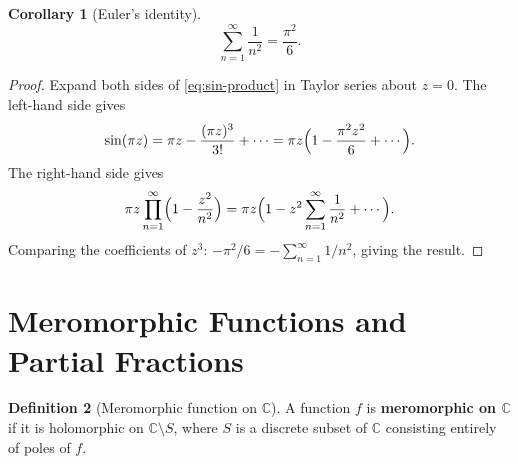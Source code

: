 \documentclass[12pt,a4paper,openany]{book}
\theoremstyle{definition}
\newtheorem{definition}{Definition}[chapter]
\theoremstyle{plain}
\newtheorem{corollary}[definition]{Corollary}
\theoremstyle{remark}
\newcommand{\C}{\mathbb{C}}
\newcommand{\Z}{\mathbb{Z}}
\DeclareMathOperator{\re}{Re}
\DeclareMathOperator{\im}{Im}
\begin{document}
\begin{center}
\label{fig:zeros-sin}
\end{center}

\begin{corollary}[Euler's identity]\label{cor:euler-identity}
\[
  \sum_{n=1}^{\infty} \frac{1}{n^2} = \frac{\pi^2}{6}.
\]
\end{corollary}

\begin{proof}
Expand both sides of \eqref{eq:sin-product} in Taylor series about $z=0$.
The left-hand side gives
\[
  \sin(\pi z) = \pi z - \frac{(\pi z)^3}{3!} + \cdots
  = \pi z\Bigl(1 - \frac{\pi^2 z^2}{6} + \cdots\Bigr).
\]
The right-hand side gives
\[
  \pi z \prod_{n=1}^{\infty}\Bigl(1 - \frac{z^2}{n^2}\Bigr)
  = \pi z \Bigl(1 - z^2\sum_{n=1}^{\infty}\frac{1}{n^2} + \cdots\Bigr).
\]
Comparing the coefficients of $z^3$:
$-\pi^2/6 = -\sum_{n=1}^{\infty}1/n^2$, giving the result.
\end{proof}


\section{Meromorphic Functions and Partial Fractions}\label{sec:meromorphic-partial}

\begin{definition}[Meromorphic function on $\C$]\label{def:meromorphic-C}
\index{meromorphic function!on $\C$}
A function $f$ is \textbf{meromorphic on $\C$} if it is holomorphic
on $\C \setminus S$, where $S$ is a discrete subset of $\C$ consisting
entirely of poles of $f$.
\end{definition}
\end{document}
